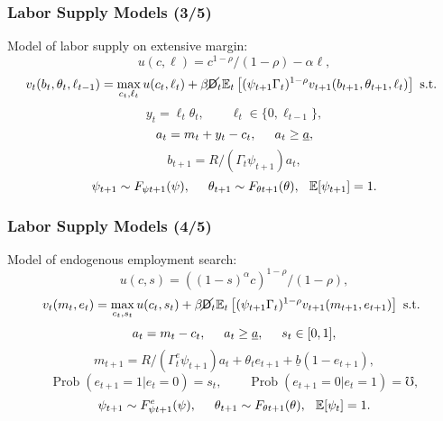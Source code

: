 \documentclass[11pt]{beamer}
\newcommand{\Prob}{\operatorname{Prob}}
\newcommand{\E}{\mathbb{E}}
\newcommand{\Die}{\mathsf{D}}
\newcommand{\Live}{\cancel{\Die}}
\begin{document}
\begin{frame}
\frametitle{Labor Supply Models (3/5)}
Model of labor supply on extensive margin:
\begin{equation*}
u(c,\ell) = c^{1-\rho}/(1-\rho) - \alpha \ell,
\end{equation*}
\begin{equation*}
v_t(b_t,\theta_t,\ell_{t-1}) = \max_{c_t, \ell_t} u(c_t,\ell_t) + \beta \Live_t \E_t \left[(\psi_{t+1} \Gamma_t)^{1-\rho} v_{t+1}(b_{t+1},\theta_{t+1},\ell_t) \right] \text{ s.t. }
\end{equation*}
\begin{equation*}
y_t = \ell_t \theta_t, \qquad \ell_t \in \{0,\ell_{t-1}\},
\end{equation*}
\begin{equation*}
a_t = m_t + y_t - c_t, \hspace{0.5cm} a_t \geq \underline{a},
\end{equation*}
\begin{equation*}
b_{t+1} = R/(\Gamma_t \psi_{t+1}) a_t, 
\end{equation*}
\begin{equation*}
\psi_{t+1} \sim F_{\psi t+1}(\psi), \hspace{0.5cm} \theta_{t+1} \sim F_{\theta t+1}(\theta), \hspace{0.25cm} \E[\psi_{t+1}] = 1.
\end{equation*}
\end{frame}



\begin{frame}
\frametitle{Labor Supply Models (4/5)}
Model of endogenous employment search:
\begin{equation*}
u(c,s) = ((1-s)^\alpha c)^{1-\rho}/(1-\rho),
\end{equation*}
\begin{equation*}
v_t(m_t,e_t) = \max_{c_t,s_t} u(c_t,s_t) + \beta \Live_t \E_t \left[(\psi_{t+1} \Gamma_t)^{1-\rho} v_{t+1}(m_{t+1},e_{t+1}) \right] \text{ s.t. }
\end{equation*}
\begin{equation*}
a_t = m_t - c_t, \hspace{0.5cm} a_t \geq \underline{a}, \hspace{0.5cm} s_t \in [0,1],
\end{equation*}
\begin{equation*}
m_{t+1} = R/(\Gamma^e_t \psi_{t+1}) a_t + \theta_t e_{t+1} + \underline{b}(1-e_{t+1}), 
\end{equation*}
\begin{equation*}
\Prob(e_{t+1} = 1 | e_t = 0) = s_t, \qquad \Prob(e_{t+1} = 0 | e_t = 1) = \mho,
\end{equation*}
\begin{equation*}
\psi_{t+1} \sim F^e_{\psi t+1}(\psi), \hspace{0.5cm} \theta_{t+1} \sim F_{\theta t+1}(\theta), \hspace{0.25cm} \E[\psi_t] = 1.
\end{equation*}
\end{frame}
\end{document}
